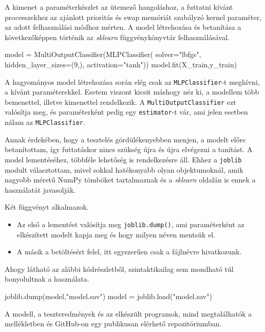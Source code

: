 A kimenet a paraméterkészlet az ütemező hangoláshoz, a futtatni kívánt processzekhez az ajánlott prioritás és swap memóriát szabályzó kernel paraméter, az adott felhasználási módhoz mérten.
A model létrehozása és betanítása a következőképpen történik az \textit{sklearn} függvénykönyvtár felhasználásával. 
\begin{python}
model = MultiOutputClassifier(MLPClassifier(
	solver="lbfgs",
	hidden_layer_sizes=(9,),
	activation="tanh"))
model.fit(X_train,y_train)
\end{python}
A hagyományos model létrehozása során elég csak az \texttt{MLPClassifier}-t meghívni, a kívánt paraméterekkel. Esetem viszont kicsit máshogy néz ki, a modellem több bemenettel, illetve kimenettel rendelkezik. A \texttt{MultiOutputClassifier} ezt valósítja meg, és paraméterként pedig egy \texttt{estimator}-t vár, ami jelen esetben nálam az \texttt{MLPClassifier}.

Annak érdekében, hogy a tesztelés gördülékenyebben menjen, a modelt előre betanítottam, így futtatáskor nincs szükség újra és újra elvégezni a tanítást.
A model lementéséhez, többféle lehetőség is rendelkezésre áll. Ehhez a \texttt{joblib} modult választottam, mivel sokkal hatékonyabb olyan objektumoknál, amik nagyobb méretű NumPy tömböket tartalmaznak és a \textit{sklearn} oldalán is ennek a használatát javasolják.

Két függvényt alkalmazok.
\begin{itemize}
	\item Az első a lementést valósítja meg \texttt{joblib.dump()}, ami paraméterként az elkészített modelt kapja meg és hogy milyen néven mentsük el.
\item A másik a betöltésért felel, itt egyszerűen csak a fájlnévre hivatkozunk.
\end{itemize}
Ahogy látható az alábbi kódrészletből, szintaktikailag sem mondható túl bonyolultnak a használata.
\begin{python}
joblib.dump(model,"model.sav") 
model = joblib.load("model.sav") 
\end{python}
A modell, a teszteredmények és az elkészült programok, mind megtalálhatók a mellékletben és GitHub-on egy publikusan elérhető repozitóriumban.
